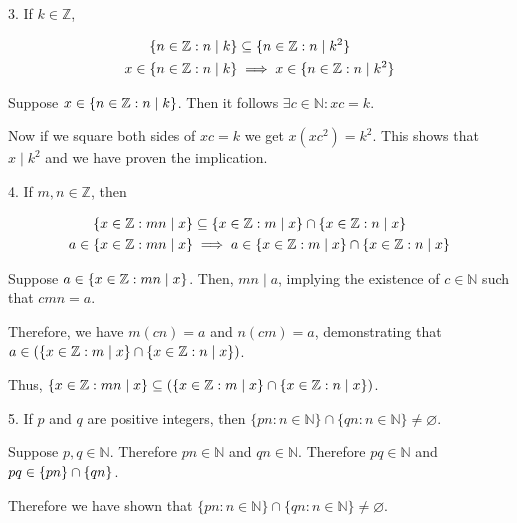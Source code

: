 \documentclass{idrisMemo}
\begin{document}
\begin{prooflist}{3. If $k \in \mathbb{Z}$,}
    \item

\begin{align*}
    \{n \in \mathbb{Z}: n \mid k\} &\subseteq \{n \in \mathbb{Z}: n \mid k^2\} \\
    x \in \{n \in \mathbb{Z}: n \mid k\} &\implies x \in \{n \in \mathbb{Z}: n \mid k^2\}
\end{align*}
\item Suppose $x \in \{n \in \mathbb{Z}: n \mid k\}$. Then it follows $\exists
    c\in\mathbb{N}: xc=k$.
\item Now if we square both sides of
$xc=k$ we get $x(xc^2) = k^2$.  This shows that $x\mid k^2$ and we have proven
the implication.
\end{prooflist}

\begin{prooflist}{4. If $m, n \in \mathbb{Z}$, then}
\item
\begin{align*}
    \{x \in \mathbb{Z}: mn \mid x\} &\subseteq \{x \in \mathbb{Z}: m \mid x\} \cap \{x \in \mathbb{Z}: n \mid x\} \\
    a \in \{x \in \mathbb{Z}: mn \mid x\} &\implies a \in \{x \in \mathbb{Z}: m \mid x\} \cap \{x \in \mathbb{Z}: n \mid x\}
\end{align*}
\item Suppose $a \in \{x \in \mathbb{Z}: mn \mid x\}$. Then, $mn \mid a$, implying the existence of $c \in \mathbb{N}$ such that $cmn = a$.
\item Therefore, we have $m(cn) = a$ and $n(cm) = a$, demonstrating that $a \in \left(\{x \in \mathbb{Z}: m \mid x\} \cap \{x \in \mathbb{Z}: n \mid x\}\right)$.
\item Thus, $\{x \in \mathbb{Z}: mn \mid x\} \subseteq \left(\{x \in \mathbb{Z}: m \mid x\} \cap \{x \in \mathbb{Z}: n \mid x\}\right)$.
\end{prooflist}

\begin{prooflist}{5. If $p$ and $q$ are positive integers, then $\{p n: n \in
\mathbb{N}\} \cap\{q n: n \in \mathbb{N}\} \neq \varnothing$.}
\item Suppose $p, q \in \mathbb{N}$. Therefore $pn \in \mathbb{N}$ and
    $qn \in \mathbb{N}$. Therefore $pq \in \mathbb{N}$ and $pq \in \{pn\} \cap
    \{qn\}$.
\item Therefore we have shown that
$\{p n: n \in \mathbb{N}\} \cap\{q n: n \in \mathbb{N}\} \neq \varnothing$.
\end{prooflist}
\end{document}
